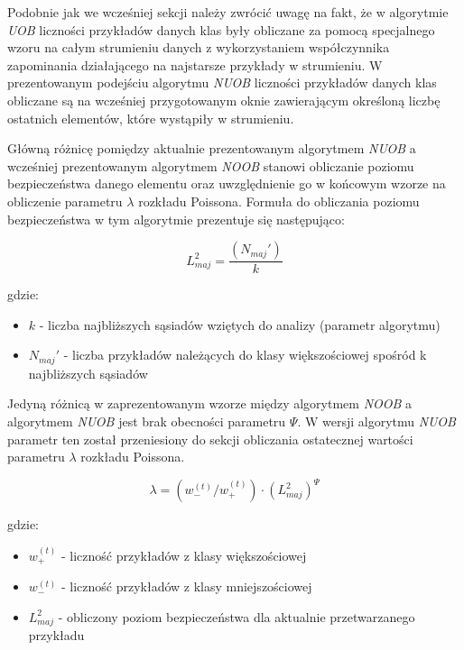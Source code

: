 Podobnie jak we wcześniej sekcji należy zwrócić uwagę na fakt, że w algorytmie \textit{UOB} liczności przykładów danych klas były obliczane za pomocą specjalnego wzoru na całym strumieniu danych z wykorzystaniem współczynnika zapominania działającego na najstarsze przykłady w strumieniu. W prezentowanym podejściu algorytmu \textit{NUOB} liczności przykładów danych klas obliczane są na wcześniej przygotowanym oknie zawierającym określoną liczbę ostatnich elementów, które wystąpiły w strumieniu.

Główną różnicę pomiędzy aktualnie prezentowanym algorytmem \textit{NUOB} a wcześniej prezentowanym algorytmem \textit{NOOB} stanowi obliczanie poziomu bezpieczeństwa danego elementu oraz uwzględnienie go w końcowym wzorze na obliczenie parametru $\lambda$ rozkładu Poissona. Formuła do obliczania poziomu bezpieczeństwa w tym algorytmie prezentuje się następująco:

\begin{equation}
    L^2_{maj} = \frac{(N_{maj}')}{k}
\end{equation}

\noindent gdzie:

\begin{itemize}
    \item $k$ - liczba najbliższych sąsiadów wziętych do analizy (parametr algorytmu)
    \item $N_{maj}'$ - liczba przykładów należących do klasy większościowej spośród k najbliższych sąsiadów
\end{itemize}

\noindent Jedyną różnicą w zaprezentowanym wzorze między algorytmem \textit{NOOB} a algorytmem \textit{NUOB} jest brak obecności parametru $\Psi$. W wersji algorytmu \textit{NUOB} parametr ten został przeniesiony do sekcji obliczania ostatecznej wartości parametru $\lambda$ rozkładu Poissona.

\begin{equation}
    \lambda = (w^{(t)}_{-}/w^{(t)}_{+}) \cdot (L^2_{maj})^{\Psi}
\end{equation}

\noindent gdzie:

\begin{itemize}
    \item $w^{(t)}_{+}$ - liczność przykładów z klasy większościowej
    \item $w^{(t)}_{-}$ - liczność przykładów z klasy mniejszościowej
    \item $L^2_{maj}$ - obliczony poziom bezpieczeństwa dla aktualnie przetwarzanego przykładu
\end{itemize}

